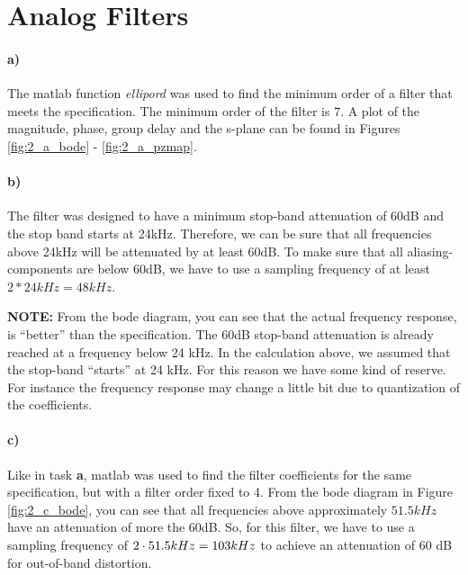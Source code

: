 \section{Analog Filters}

\paragraph{a)}
The matlab function \textit{ellipord} was used to find the minimum order of a filter that meets
the specification. The minimum order of the filter is 7. A plot of the magnitude, phase, group delay and
the s-plane can be found in Figures \ref{fig:2_a_bode} - \ref{fig:2_a_pzmap}.

\paragraph{b)}

The filter was designed to have a minimum stop-band attenuation of 60dB and the stop band starts
at 24kHz. Therefore, we can be sure that all frequencies above 24kHz will be attenuated by at least 60dB.
To make sure that all aliasing-components are below 60dB, we have to use a sampling frequency of at least
$2*24kHz = 48kHz$.

\textbf{NOTE:} From the bode diagram, you can see that the actual frequency response, is ``better'' than
the specification. The 60dB stop-band attenuation is already reached at a frequency below 24 kHz.
In the calculation above, we assumed that the stop-band ``starts'' at 24 kHz. For this reason we have
some kind of reserve. For instance the frequency response may change a little bit due to quantization of the coefficients.

\paragraph{c)}

Like in task \textbf{a}, matlab was used to find the filter coefficients for the same specification,
but with a filter order fixed to 4. From the bode diagram in Figure \ref{fig:2_c_bode}, you
can see that all frequencies above approximately $51.5 kHz$ have an attenuation of more the 60dB.
So, for this filter, we have to use a sampling frequency of $2 \cdot 51.5 kHz = 103 kHz$ to 
achieve an attenuation of 60 dB for out-of-band distortion.

